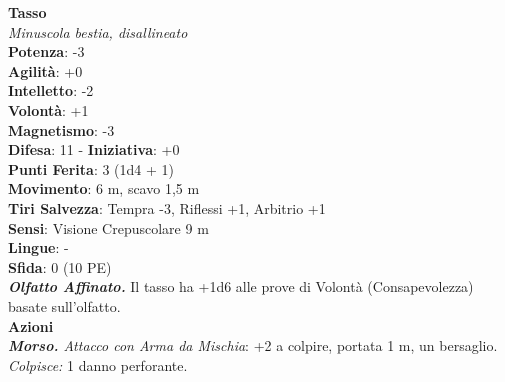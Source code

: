 \begin{multicols}{2}
\medskip\textbf{Tasso}\\
\emph{Minuscola bestia, disallineato}\\
\textbf{Potenza}: -3\\
\textbf{Agilità}: +0\\
\textbf{Intelletto}: -2\\
\textbf{Volontà}: +1\\
\textbf{Magnetismo}: -3\\
\textbf{Difesa}: 11 - \textbf{Iniziativa}: +0\\
\textbf{Punti Ferita}: 3 (1d4 + 1)\\
\textbf{Movimento}: 6 m, scavo 1,5 m\\
\textbf{Tiri Salvezza}: Tempra -3, Riflessi +1, Arbitrio +1\\
\textbf{Sensi}: Visione Crepuscolare 9 m\\
\textbf{Lingue}: -\\
\textbf{Sfida}: 0 (10 PE)\smallskip\\
\emph{\textbf{Olfatto Affinato.}} Il tasso ha +1d6 alle prove di Volontà (Consapevolezza) basate sull'olfatto.\\
\smallskip\textbf{Azioni}\\
\emph{\textbf{Morso.} Attacco con Arma da Mischia}: +2 a colpire, portata 1 m, un bersaglio.\\
\emph{Colpisce:} 1 danno perforante.\\


\end{multicols}
